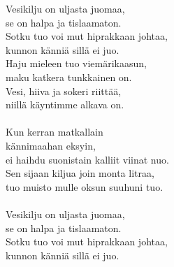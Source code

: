 
            Vesikilju on uljasta juomaa, \\
            se on halpa ja tislaamaton. \\
            Sotku tuo voi mut hiprakkaan johtaa, \\
            kunnon känniä sillä ei juo. \\
            Haju mieleen tuo viemärikaasun, \\
            maku katkera tunkkainen on. \\
            Vesi, hiiva ja sokeri riittää, \\
            niillä käyntimme alkava on. \\
\hspace{10mm} \\
            Kun kerran matkallain \\
            kännimaahan eksyin, \\
            ei haihdu suonistain kalliit viinat nuo. \\
            Sen sijaan kiljua join monta litraa, \\
            tuo muisto mulle oksun suuhuni tuo. \\
\hspace{10mm} \\
            Vesikilju on uljasta juomaa, \\
            se on halpa ja tislaamaton. \\
            Sotku tuo voi mut hiprakkaan johtaa, \\
            kunnon känniä sillä ei juo. \\
